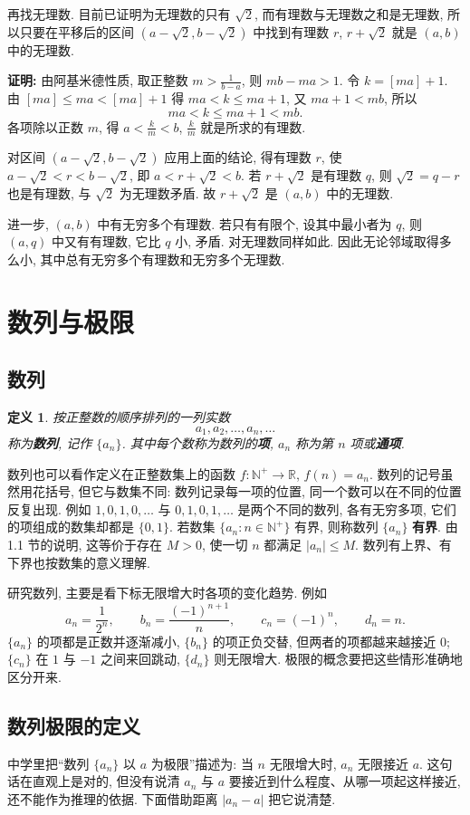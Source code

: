 \documentclass[UTF8,openany]{ctexbook}
\theoremstyle{chinesetextbook}
\newtheorem{definition}{定义}[section]
\newenvironment{cnproof}{\par\indent\textbf{证明:} \ignorespaces}{\par}
\begin{document}
再找无理数. 目前已证明为无理数的只有 $\sqrt2$, 而有理数与无理数之和是无理数, 所以只要在平移后的区间 $(a-\sqrt2,b-\sqrt2)$ 中找到有理数 $r$, $r+\sqrt2$ 就是 $(a,b)$ 中的无理数.
\begin{cnproof}
由阿基米德性质, 取正整数 $\displaystyle m>\frac1{b-a}$, 则 $mb-ma>1$. 令 $k=[ma]+1$. 由 $[ma]\le ma<[ma]+1$ 得 $ma<k\le ma+1$, 又 $ma+1<mb$, 所以
\[
ma<k\le ma+1<mb.
\]
各项除以正数 $m$, 得 $\displaystyle a<\frac km<b$, $\displaystyle\frac km$ 就是所求的有理数.

对区间 $(a-\sqrt2,b-\sqrt2)$ 应用上面的结论, 得有理数 $r$, 使 $a-\sqrt2<r<b-\sqrt2$, 即 $a<r+\sqrt2<b$. 若 $r+\sqrt2$ 是有理数 $q$, 则 $\sqrt2=q-r$ 也是有理数, 与 $\sqrt2$ 为无理数矛盾. 故 $r+\sqrt2$ 是 $(a,b)$ 中的无理数.
\end{cnproof}
进一步, $(a,b)$ 中有无穷多个有理数. 若只有有限个, 设其中最小者为 $q$, 则 $(a,q)$ 中又有有理数, 它比 $q$ 小, 矛盾. 对无理数同样如此. 因此无论邻域取得多么小, 其中总有无穷多个有理数和无穷多个无理数.
\section{数列与极限}
\subsection{数列}
\begin{definition}
按正整数的顺序排列的一列实数
\[
a_1,a_2,\ldots,a_n,\ldots
\]
称为\textbf{数列}, 记作 $\{a_n\}$. 其中每个数称为数列的\textbf{项}, $a_n$ 称为第 $n$ 项或\textbf{通项}.
\end{definition}
数列也可以看作定义在正整数集上的函数 $f:\mathbb N^+\to\mathbb R$, $f(n)=a_n$. 数列的记号虽然用花括号, 但它与数集不同: 数列记录每一项的位置, 同一个数可以在不同的位置反复出现. 例如 $1,0,1,0,\ldots$ 与 $0,1,0,1,\ldots$ 是两个不同的数列, 各有无穷多项, 它们的项组成的数集却都是 $\{0,1\}$. 若数集 $\{a_n:n\in\mathbb N^+\}$ 有界, 则称数列 $\{a_n\}$ \textbf{有界}. 由 1.1 节的说明, 这等价于存在 $M>0$, 使一切 $n$ 都满足 $|a_n|\le M$. 数列有上界、有下界也按数集的意义理解.

研究数列, 主要是看下标无限增大时各项的变化趋势. 例如
\[
a_n=\frac1{2^n},\qquad b_n=\frac{(-1)^{n+1}}n,\qquad c_n=(-1)^n,\qquad d_n=n.
\]
$\{a_n\}$ 的项都是正数并逐渐减小, $\{b_n\}$ 的项正负交替, 但两者的项都越来越接近 $0$; $\{c_n\}$ 在 $1$ 与 $-1$ 之间来回跳动, $\{d_n\}$ 则无限增大. 极限的概念要把这些情形准确地区分开来.
\subsection{数列极限的定义}
中学里把“数列 $\{a_n\}$ 以 $a$ 为极限”描述为: 当 $n$ 无限增大时, $a_n$ 无限接近 $a$. 这句话在直观上是对的, 但没有说清 $a_n$ 与 $a$ 要接近到什么程度、从哪一项起这样接近, 还不能作为推理的依据. 下面借助距离 $|a_n-a|$ 把它说清楚.
\end{document}
